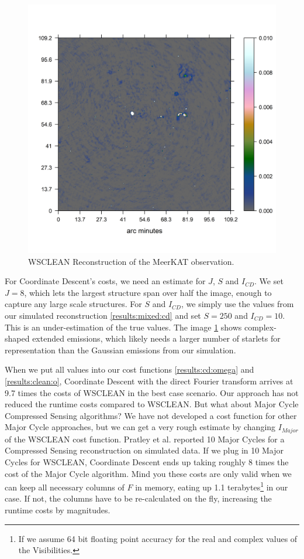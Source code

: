 \begin{figure}[h]
	\centering
	\includegraphics[width=0.6\linewidth]{./chapters/21.scalability/meerkat.png}
	\caption{WSCLEAN Reconstruction of the MeerKAT observation.}
	\label{scale:wsclean}
\end{figure}

For Coordinate Descent's costs, we need an estimate for $J$, $S$ and $I_{CD}$. We set $J=8$, which lets the largest structure span over half the image, enough to capture any large scale structures. For $S$ and $I_{CD}$, we simply use the values from our simulated reconstruction \ref{results:mixed:cd} and set $S=250$ and 
$I_{CD}=10$. This is an under-estimation of the true values. The image \ref{scale:wsclean} shows complex-shaped extended emissions, which likely needs a larger number of starlets for representation than the Gaussian emissions from our simulation. 

When we put all values into our cost functions \eqref{results:cd:omega} and \eqref{results:clean:o}, Coordinate Descent with the direct Fourier transform arrives at 9.7 times the costs of WSCLEAN in the best case scenario. Our approach has not reduced the runtime costs compared to WSCLEAN. But what about Major Cycle Compressed Sensing algorithms? We have not developed a cost function for other Major Cycle approaches, but we can get a very rough estimate by changing $I_{Major}$ of the WSCLEAN cost function. Pratley et al.\cite{pratley2018fast} reported 10 Major Cycles for a Compressed Sensing reconstruction on simulated data. If we plug in 10 Major Cycles for WSCLEAN, Coordinate Descent ends up taking roughly 8 times the cost of the Major Cycle algorithm. Mind you these costs are only valid when we can keep all necessary columns of $F$ in memory, eating up 1.1 terabytes\footnote{If we assume 64 bit floating point accuracy for the real and complex values of the Visibilities.} in our case. If not, the columns have to be re-calculated on the fly, increasing the runtime costs by magnitudes. 


